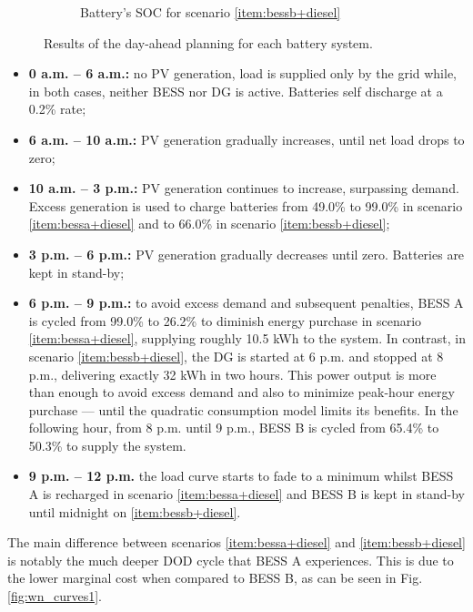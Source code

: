 \documentclass{ieeeaccess}
\begin{document}
\begin{figure}[!h]
\begin{subfigure}{.235\textwidth}
            \caption{Battery's \ac{SOC} for scenario \ref{item:bessb+diesel}}
            \label{fig:result-soc-B}
        \end{subfigure}
        \caption{Results of the day-ahead planning for each battery system.}
        \label{fig:results}
    \end{figure}

    \begin{itemize}
        \item \textbf{0 a.m. -- 6 a.m.:} no \ac{PV} generation, load is supplied only by the grid while, in both cases, neither \ac{BESS} nor \ac{DG} is active. Batteries self discharge at a 0.2\% rate;
        \item \textbf{6 a.m. -- 10 a.m.:} \ac{PV} generation gradually increases, until net load drops to zero;
        \item \textbf{10 a.m. -- 3 p.m.:} \ac{PV} generation continues to increase, surpassing demand. Excess generation is used to charge batteries from 49.0\% to 99.0\% in scenario \ref{item:bessa+diesel} and to 66.0\% in scenario \ref{item:bessb+diesel};
        \item \textbf{3 p.m. -- 6 p.m.:} \ac{PV} generation gradually decreases until zero. Batteries are kept in stand-by;
        \item \textbf{6 p.m. -- 9 p.m.:} to avoid excess demand and subsequent penalties, \ac{BESS} A is cycled from 99.0\% to 26.2\% to diminish energy purchase in scenario \ref{item:bessa+diesel}, supplying roughly 10.5 kWh to the system. In contrast, in scenario \ref{item:bessb+diesel}, the \ac{DG} is started at 6 p.m. and stopped at 8 p.m., delivering exactly 32 kWh in two hours. This power output is more than enough to avoid excess demand and also to minimize peak-hour energy purchase --- until the quadratic consumption model limits its benefits. In the following hour, from 8 p.m. until 9 p.m., \ac{BESS} B is cycled from 65.4\% to 50.3\% to supply the system.
        \item \textbf{9 p.m. -- 12 p.m.} the load curve starts to fade to a minimum whilst \ac{BESS} A is recharged in scenario \ref{item:bessa+diesel} and \ac{BESS} B is kept in stand-by until midnight on \ref{item:bessb+diesel}.
    \end{itemize}

    The main difference between scenarios \ref{item:bessa+diesel} and \ref{item:bessb+diesel} is notably the much deeper \ac{DOD} cycle that \ac{BESS} A experiences. This is due to the lower marginal cost when compared to \ac{BESS} B, as can be seen in Fig. \ref{fig:wn_curves1}.
\end{document}
